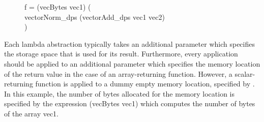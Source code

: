 \begin{figure}[H]
\hfill\begin{minipage}{.75\textwidth}\raggedright
f =  \vallocterm{} (vecBytes vec1) (
\\
\tabt \tabt
vectorNorm\_dps \stgempty{} (vectorAdd\_dps  vec1 vec2)
\\
\tabt )
\end{minipage}\hfill
\end{figure}
Each lambda abstraction typically takes an additional parameter which specifies the storage space that 
is used for its result.  Furthermore, every application should be applied to an additional parameter 
which specifies the memory location of the return value in the case of an array-returning function. 
However, a scalar-returning function is applied to a dummy empty memory location, specified by \stgempty{}. 
In this example, the number of bytes allocated for the memory location  is specified
by the expression (vecBytes vec1) which computes the number of bytes of the array vec1.


